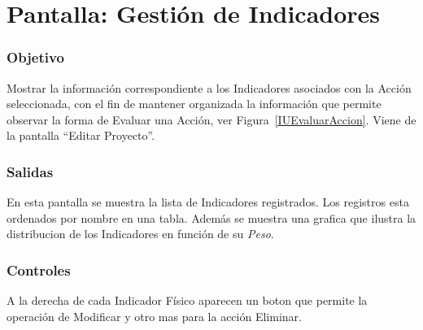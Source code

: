 \section{Pantalla: Gestión de Indicadores}

\subsubsection{Objetivo}
Mostrar la información correspondiente a los Indicadores asociados con la Acción seleccionada, con el fin de mantener organizada la información que permite observar la forma de Evaluar una Acción, ver Figura~\ref{IUEvaluarAccion}. Viene de la pantalla ``Editar Proyecto''.


\subsubsection{Salidas}
En esta pantalla se muestra la lista de Indicadores registrados. Los registros esta ordenados por nombre en una tabla. Además se muestra una grafica que ilustra la distribucion de los Indicadores en función de su \textit{Peso}.

\subsubsection{Controles}
A la derecha de cada Indicador Físico aparecen un boton que permite la operación de Modificar y otro mas para la acción Eliminar.

